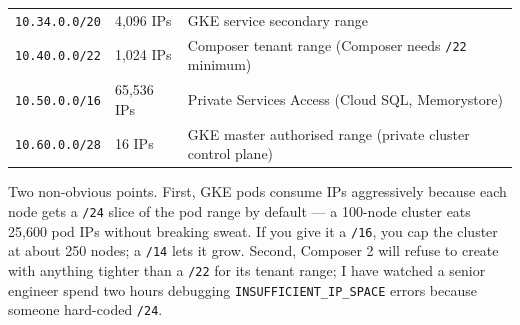 \documentclass[
  11pt,
  british,
  oneside]{book}
\begin{document}
\begin{longtable}[]{@{}lll@{}}
\begin{minipage}[t]{0.30\columnwidth}
\texttt{10.34.0.0/20}\strut
\end{minipage} & \begin{minipage}[t]{0.30\columnwidth}\raggedright
4,096 IPs\strut
\end{minipage} & \begin{minipage}[t]{0.30\columnwidth}\raggedright
GKE service secondary range\strut
\end{minipage}\tabularnewline
\begin{minipage}[t]{0.30\columnwidth}\raggedright
\texttt{10.40.0.0/22}\strut
\end{minipage} & \begin{minipage}[t]{0.30\columnwidth}\raggedright
1,024 IPs\strut
\end{minipage} & \begin{minipage}[t]{0.30\columnwidth}\raggedright
Composer tenant range (Composer needs \texttt{/22} minimum)\strut
\end{minipage}\tabularnewline
\begin{minipage}[t]{0.30\columnwidth}\raggedright
\texttt{10.50.0.0/16}\strut
\end{minipage} & \begin{minipage}[t]{0.30\columnwidth}\raggedright
65,536 IPs\strut
\end{minipage} & \begin{minipage}[t]{0.30\columnwidth}\raggedright
Private Services Access (Cloud SQL, Memorystore)\strut
\end{minipage}\tabularnewline
\begin{minipage}[t]{0.30\columnwidth}\raggedright
\texttt{10.60.0.0/28}\strut
\end{minipage} & \begin{minipage}[t]{0.30\columnwidth}\raggedright
16 IPs\strut
\end{minipage} & \begin{minipage}[t]{0.30\columnwidth}\raggedright
GKE master authorised range (private cluster control plane)\strut
\end{minipage}\tabularnewline
\bottomrule
\end{longtable}

Two non-obvious points. First, GKE pods consume IPs aggressively because
each node gets a \texttt{/24} slice of the pod range by default --- a
100-node cluster eats 25,600 pod IPs without breaking sweat. If you give
it a \texttt{/16}, you cap the cluster at about 250 nodes; a
\texttt{/14} lets it grow. Second, Composer 2 will refuse to create with
anything tighter than a \texttt{/22} for its tenant range; I have
watched a senior engineer spend two hours debugging
\texttt{INSUFFICIENT\_IP\_SPACE} errors because someone hard-coded
\texttt{/24}.
\end{document}

